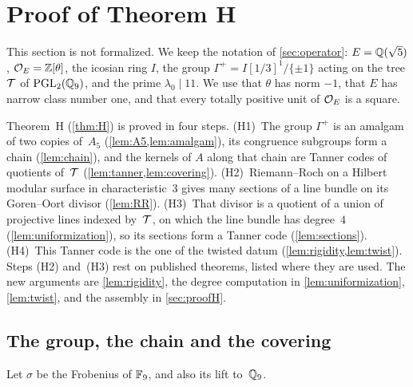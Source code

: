 \section{Proof of Theorem H}\label{sec:hypothesis}

This section is not formalized. We keep the notation of \cref{sec:operator}: $E=\mathbb{Q}(\sqrt5)$, $\mathcal{O}_E=\mathbb{Z}[\theta]$, the
icosian ring $I$, the group $\Gamma^+=I[1/3]^1/\{\pm1\}$ acting on the tree $\mathcal{T}$ of $\operatorname{PGL}_2(\mathbb{Q}_9)$, and the prime
$\lambda_0\mid11$. We use that $\theta$ has norm $-1$, that $E$ has narrow class number one, and that every totally
positive unit of $\mathcal{O}_E$ is a square.

Theorem~H (\cref{thm:H}) is proved in four steps. (H1)~The group $\Gamma^+$ is an amalgam of two copies of~$A_5$
(\cref{lem:A5,lem:amalgam}), its congruence subgroups form a chain (\cref{lem:chain}), and the kernels of $A$ along that
chain are Tanner codes of quotients of~$\mathcal{T}$ (\cref{lem:tanner,lem:covering}). (H2)~Riemann--Roch on a Hilbert modular
surface in characteristic~$3$ gives many sections of a line bundle on its Goren--Oort divisor (\cref{lem:RR}). (H3)~That
divisor is a quotient of a union of projective lines indexed by~$\mathcal{T}$, on which the line bundle has degree~$4$
(\cref{lem:uniformization}), so its sections form a Tanner code (\cref{lem:sections}). (H4)~This Tanner code is the one of
the twisted datum (\cref{lem:rigidity,lem:twist}). Steps (H2) and~(H3) rest on published theorems, listed where they are
used. The new arguments are \cref{lem:rigidity}, the degree computation in \cref{lem:uniformization}, \cref{lem:twist},
and the assembly in \cref{sec:proofH}.

\subsection{The group, the chain and the covering}\label{sec:groupchain}

Let $\sigma$ be the Frobenius of $\mathbb{F}_9$, and also its lift to~$\mathbb{Q}_9$.

